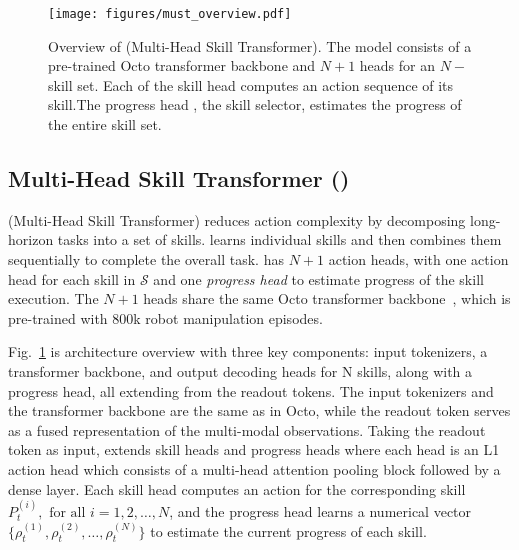 \begin{figure}[ht]
    \centering
    \texttt{[image: figures/must\_overview.pdf]}
    \caption{Overview of \ours(Multi-Head Skill Transformer). 
    The model consists of a pre-trained Octo transformer backbone\cite{team2024octo} and $N+1$ heads for an $N-$skill set. 
    Each of the skill head computes an action sequence of its skill.The progress head \progss, the skill selector, estimates the progress of the entire skill set.}
    \label{fig:overview}
\end{figure}
\subsection{Multi-Head Skill Transformer (\ours)}

\ours (Multi-Head Skill Transformer) reduces action complexity by decomposing long-horizon tasks into a set of skills. \ours learns individual skills and then combines them sequentially to complete the overall task.
\ours has $N+1$ action heads, with one action head for each skill in $\mathcal{S}$ and one \emph{progress head} to estimate progress of the skill execution. 
The $N+1$ heads share the same Octo transformer backbone~\cite{team2024octo}, which is pre-trained with 800k robot manipulation episodes.

Fig.~\ref{fig:overview} is \ours architecture overview with three key components: input tokenizers, a transformer backbone, and output decoding heads for N skills, along with a progress head, all extending from the readout tokens.
The input tokenizers and the transformer backbone are the same as in Octo, while the readout token serves as a fused representation of the multi-modal observations.
Taking the readout token as input, \ours extends skill heads and progress heads where each head is an L1 action head which consists of a multi-head attention pooling block followed by a dense layer. Each skill head computes an action for the corresponding skill $P_t^{(i)}, \text{ for all } i = 1, 2, \dots, N$, 
 and the progress head learns a numerical vector $\{\rho_t^{(1)}, \rho_t^{(2)}, \dots, \rho_t^{(N)}\}$ to estimate the current progress of each skill. 

